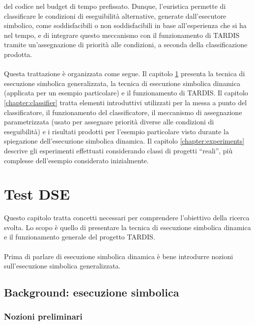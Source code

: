 \documentclass[a4paper, 12pt, oneside]{book}
\newcommand{\qq}[1]{``#1''}
\theoremstyle{normal}
\begin{document}
del codice nel budget di tempo prefissato. Dunque, l'euristica permette di classificare le condizioni di eseguibilità alternative, generate dall'esecutore simbolico, come soddisfacibili o non soddisfacibili in base all'esperienza che si ha nel tempo, e di integrare questo meccanismo con il funzionamento di TARDIS tramite un'assegnazione di priorità alle condizioni, a seconda della classificazione prodotta. \\ \\ Questa trattazione è organizzata come segue. Il capitolo \ref{chapter:dse} presenta la tecnica di esecuzione simbolica generalizzata, la tecnica di esecuzione simbolica dinamica (applicata per un esempio particolare) e il funzionamento di TARDIS. Il capitolo \ref{chapter:classifier} tratta elementi introduttivi utilizzati per la messa a punto del classificatore, il funzionamento del classificatore, il meccanismo di assegnazione parametrizzata (usato per assegnare priorità diverse alle condizioni di eseguibilità) e i risultati prodotti per l'esempio particolare visto durante la spiegazione dell'esecuzione simbolica dinamica. Il capitolo \ref{chapter:experiments} descrive gli esperimenti effettuati considerando classi di progetti \qq{reali}, più complesse dell'esempio considerato inizialmente.



\chapter{Test DSE}\label{chapter:dse}

Questo capitolo tratta concetti necessari per comprendere l'obiettivo della ricerca svolta. Lo scopo è quello di presentare la tecnica di esecuzione simbolica dinamica e il funzionamento generale del progetto TARDIS.   
\\ \\ Prima di parlare di esecuzione simbolica dinamica è bene introdurre nozioni sull'esecuzione simbolica generalizzata.

\section{Background: esecuzione simbolica}

\subsection{Nozioni preliminari}
\end{document}
